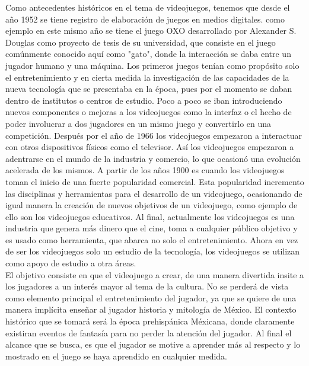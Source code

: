 Como antecedentes históricos en el tema de videojuegos, tenemos que desde el año 1952 se tiene registro de elaboración de juegos en medios digitales. como ejemplo en este mismo año se tiene el juego OXO desarrollado por Alexander S. Douglas como proyecto de tesis de su universidad, que consiste en el juego comúnmente conocido aquí como "gato", donde la interacción se daba entre un jugador humano y una máquina. Los primeros juegos tenían como propósito solo el entretenimiento y en cierta medida la investigación de las capacidades de la nueva tecnología que se presentaba en la época, pues por el momento se daban dentro de institutos o centros de estudio. Poco a poco se iban introduciendo nuevos componentes o mejoras a los videojuegos como la interfaz o el hecho de poder involucrar a dos jugadores en un mismo juego y convertirlo en una competición. Después por el año de 1966 los videojuegos empezaron a interactuar con otros dispositivos físicos como el televisor. Así los videojuegos empezaron a adentrarse en el mundo de la industria y comercio, lo que ocasionó una evolución acelerada de los mismos. A partir de los años 1900 es cuando los videojuegos toman el inicio de una fuerte popularidad comercial. Esta popularidad incremento las disciplinas y herramientas para el desarrollo de un videojuego, ocasionando de igual manera la creación de nuevos objetivos de un videojuego, como ejemplo de ello son los videojuegos educativos. Al final, actualmente los videojuegos es una industria que genera más dinero que el cine, toma a cualquier público objetivo y es usado como herramienta, que abarca no solo el entretenimiento. Ahora en vez de ser los videojuegos solo un estudio de la tecnología, los videojuegos se utilizan como apoyo de estudio a otra áreas.    
\\[1pt]

El objetivo consiste en que el videojuego a crear, de una manera divertida insite a los jugadores a un interés mayor al tema de la cultura. No se perderá de vista como elemento principal el entretenimiento del jugador, ya que se quiere de una manera implícita enseñar al jugador historia y mitología de México. El contexto histórico que se tomará será la época prehispánica Méxicana, donde claramente existiran eventos de fantasía para no perder la atención del jugador. Al final el alcance que se busca, es que el jugador se motive a aprender más al respecto y lo mostrado en el juego se haya aprendido en cualquier medida. 
\\[1pt]

